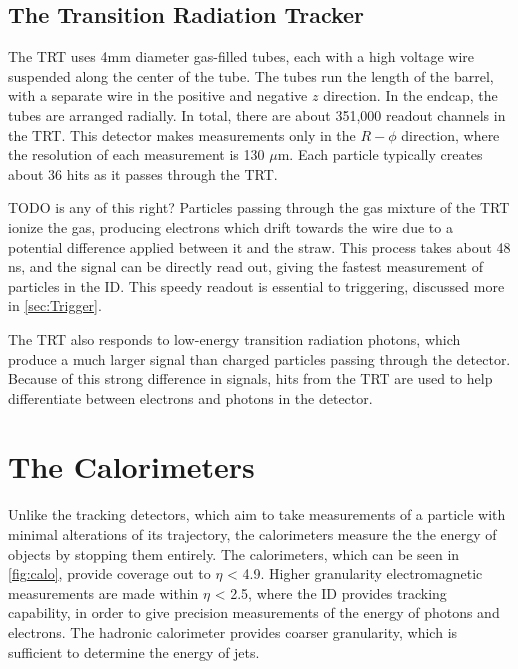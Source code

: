 \subsection{The Transition Radiation Tracker}

The \ac{TRT} uses 4mm diameter gas-filled tubes, each with a high voltage wire suspended along the center of the tube. The tubes run the length of the barrel, with a separate wire in the positive and negative $z$ direction. In the endcap, the tubes are arranged radially. In total, there are about 351,000 readout channels in the \ac{TRT}. This detector makes measurements only in the $R-\phi$ direction, where the resolution of each measurement is 130 $\mu$m. Each particle typically creates about 36 hits as it passes through the \ac{TRT}. 

TODO is any of this right?
Particles passing through the gas mixture of the \ac{TRT} ionize the gas, producing electrons which drift towards the wire due to a potential difference applied between it and the straw. This process takes about 48 ns, and the signal can be directly read out, giving the fastest measurement of particles in the \ac{ID}. This speedy readout is essential to triggering, discussed more in \autoref{sec:Trigger}. 

The \ac{TRT} also responds to low-energy transition radiation photons, which produce a much larger signal than charged particles passing through the detector. Because of this strong difference in signals, hits from the \ac{TRT} are used to help differentiate between electrons and photons in the detector.

\section{The Calorimeters}
\label{sec:Calo}

Unlike the tracking detectors, which aim to take measurements of a particle with minimal alterations of its trajectory, the calorimeters measure the the energy of objects by stopping them entirely. The calorimeters, which can be seen in \autoref{fig:calo}, provide coverage out to $\eta$ < 4.9. Higher granularity electromagnetic measurements are made within $\eta$ < 2.5, where the \ac{ID} provides tracking capability, in order to give precision measurements of the energy of photons and electrons. The hadronic calorimeter provides coarser granularity, which is sufficient to determine the energy of jets. 

